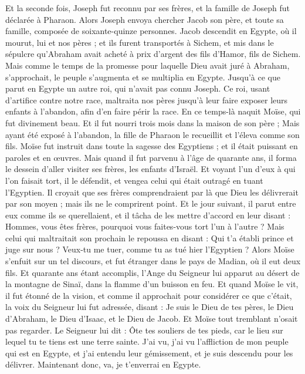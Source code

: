 \begin{multicols}{2}
Et la seconde fois, Joseph fut reconnu par ses frères, et la famille de Joseph fut déclarée à Pharaon.
Alors Joseph envoya chercher Jacob son père, et toute sa famille, composée de soixante-quinze personnes.
Jacob descendit en Egypte, où il mourut, lui et nos pères ;
et ils furent transportés à Sichem, et mis dans le sépulcre qu'Abraham avait acheté à prix d'argent des fils d'Hamor, fils de Sichem.
Mais comme le temps de la promesse pour laquelle Dieu avait juré à Abraham, s'approchait, le peuple s'augmenta et se multiplia en Egypte.
Jusqu'à ce que parut en Egypte un autre roi, qui n'avait pas connu Joseph.
Ce roi, usant d'artifice contre notre race, maltraita nos pères jusqu'à leur faire exposer leurs enfants à l'abandon, afin d'en faire périr la race.
En ce temps-là naquit Moïse, qui fut divinement beau. Et il fut nourri trois mois dans la maison de son père ;
Mais ayant été exposé à l'abandon, la fille de Pharaon le recueillit et l'éleva comme son fils.
Moïse fut instruit dans toute la sagesse des Egyptiens ; et il était puissant en paroles et en œuvres.
Mais quand il fut parvenu à l'âge de quarante ans, il forma le dessein d'aller visiter ses frères, les enfants d'Israël.
Et voyant l'un d'eux à qui l'on faisait tort, il le défendit, et vengea celui qui était outragé en tuant l'Egyptien.
Il croyait que ses frères comprendraient par là que Dieu les délivrerait par son moyen ; mais ils ne le comprirent point.
Et le jour suivant, il parut entre eux comme ils se querellaient, et il tâcha de les mettre d'accord en leur disant : Hommes, vous êtes frères, pourquoi vous faites-vous tort l'un à l'autre ?
Mais celui qui maltraitait son prochain le repoussa en disant : Qui t'a établi prince et juge sur nous ?
Veux-tu me tuer, comme tu as tué hier l'Egyptien ?
Alors Moïse s'enfuit sur un tel discours, et fut étranger dans le pays de Madian, où il eut deux fils.
Et quarante ans étant accomplis, l'Ange du Seigneur lui apparut au désert de la montagne de Sinaï, dans la flamme d'un buisson en feu.
Et quand Moïse le vit, il fut étonné de la vision, et comme il approchait pour considérer ce que c'était, la voix du Seigneur lui fut adressée,
disant : Je suis le Dieu de tes pères, le Dieu d'Abraham, le Dieu d'Isaac, et le Dieu de Jacob. Et Moïse tout tremblant n'osait pas regarder.
Le Seigneur lui dit : Ôte tes souliers de tes pieds, car le lieu sur lequel tu te tiens est une terre sainte.
J'ai vu, j'ai vu l'affliction de mon peuple qui est en Egypte, et j'ai entendu leur gémissement, et je suis descendu pour les délivrer. Maintenant donc, va, je t'enverrai en Egypte.

\end{multicols}
